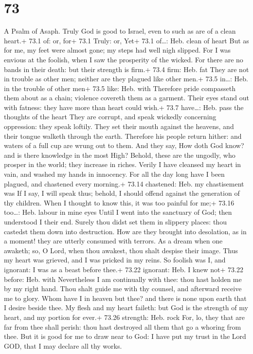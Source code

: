 \hypertarget{section-72}{%
\section{73}\label{section-72}}

A Psalm of Asaph.  Truly God is good to Israel, even to such
as are of a clean heart.+ 73.1 of: or, for+ 73.1 Truly: or, Yet+ 73.1
of\ldots: Heb. clean of heart  But as for me, my feet were
almost gone; my steps had well nigh slipped.  For I was
envious at the foolish, when I saw the prosperity of the wicked.
 For there are no bands in their death: but their strength
is firm.+ 73.4 firm: Heb. fat  They are not in trouble as
other men; neither are they plagued like other men.+ 73.5 in\ldots: Heb.
in the trouble of other men+ 73.5 like: Heb. with  Therefore
pride compasseth them about as a chain; violence covereth them as a
garment.  Their eyes stand out with fatness: they have more
than heart could wish.+ 73.7 have\ldots: Heb. pass the thoughts of the
heart  They are corrupt, and speak wickedly concerning
oppression: they speak loftily.  They set their mouth
against the heavens, and their tongue walketh through the earth.
 Therefore his people return hither: and waters of a full
cup are wrung out to them.  And they say, How doth God
know? and is there knowledge in the most High?  Behold,
these are the ungodly, who prosper in the world; they increase in
riches.  Verily I have cleansed my heart in vain, and
washed my hands in innocency.  For all the day long have I
been plagued, and chastened every morning.+ 73.14 chastened: Heb. my
chastisement was  If I say, I will speak thus; behold, I
should offend against the generation of thy children.  When
I thought to know this, it was too painful for me;+ 73.16 too\ldots:
Heb. labour in mine eyes  Until I went into the sanctuary
of God; then understood I their end.  Surely thou didst set
them in slippery places: thou castedst them down into destruction.
 How are they brought into desolation, as in a moment! they
are utterly consumed with terrors.  As a dream when one
awaketh; so, O Lord, when thou awakest, thou shalt despise their image.
 Thus my heart was grieved, and I was pricked in my reins.
 So foolish was I, and ignorant: I was as a beast before
thee.+ 73.22 ignorant: Heb. I knew not+ 73.22 before: Heb. with
 Nevertheless I am continually with thee: thou hast holden
me by my right hand.  Thou shalt guide me with thy counsel,
and afterward receive me to glory.  Whom have I in heaven
but thee? and there is none upon earth that I desire beside thee.
 My flesh and my heart faileth: but God is the strength of
my heart, and my portion for ever.+ 73.26 strength: Heb. rock
 For, lo, they that are far from thee shall perish: thou
hast destroyed all them that go a whoring from thee.  But
it is good for me to draw near to God: I have put my trust in the Lord
GOD, that I may declare all thy works.

